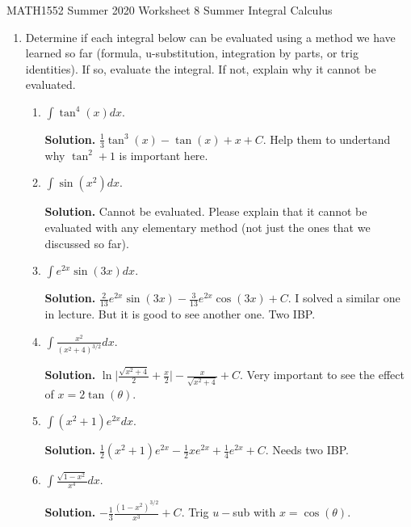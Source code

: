 \documentclass[12pt]{article}
\begin{document}
\noindent
MATH1552 Summer 2020
\hspace{2.2cm}
Worksheet 8 Summer
\hspace{2cm} Integral Calculus

\vspace{2mm}


\begin{enumerate}

\item Determine if each integral below can be evaluated using a method we have learned so
far (formula, u-substitution, integration by parts, or trig identities). If so, evaluate the
integral. If not, explain why it cannot be evaluated.



\begin{enumerate}


\item $\int \tan^4(x)dx$.

\textbf{Solution. } $\frac{1}{3}\tan^3(x)-\tan(x)+x+C$. Help them to undertand why $\tan^2+1$ is important here.

\item $\int \sin(x^2)dx$.

\textbf{Solution. } Cannot be evaluated. Please explain that it cannot be evaluated with any elementary method (not just the ones that we discussed so far).

\item $\int e^{2x}\sin(3x)dx$.

\textbf{Solution. } $\frac{2}{13}e^{2x}\sin(3x)-\frac{3}{13}e^{2x}\cos(3x)+C$. I solved a similar one in lecture. But it is good to see another one. Two IBP.

\item $\int \frac{x^2}{(x^2+4)^{3/2}}dx$.

\textbf{Solution. }$\ln\big\vert \frac{\sqrt{x^2+4}}{2}+\frac{x}{2}\big\vert - \frac{x}{\sqrt{x^2+4}}+C$. Very important to see the effect of $x = 2\tan(\theta)$.

\item $\int (x^2+1)e^{2x}dx$.

\textbf{Solution. } $\frac{1}{2}(x^2+1)e^{2x} - \frac{1}{2}xe^{2x} + \frac{1}{4}e^{2x} + C.$ Needs two IBP. 

\item $\int \frac{\sqrt{1-x^2}}{x^4}dx$.

\textbf{Solution. } $-\frac{1}{3} \frac{(1-x^2)^{3/2}}{x^3}+C$. Trig $u-$sub with $x=\cos(\theta)$.


\end{enumerate}
\end{enumerate}
\end{document}
